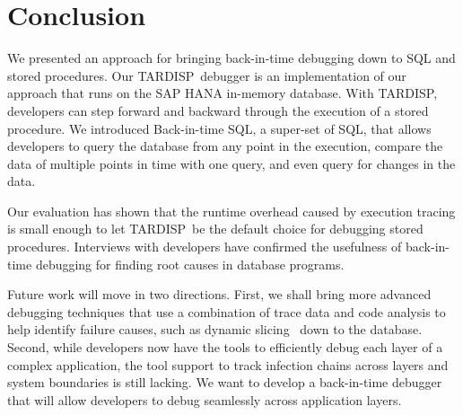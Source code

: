 \documentclass[english,conference,final]{IEEEtran}
\newcommand{\tool}{TAR\-DISP}
\newcommand{\SQLextension}{Back-in-time SQL}
\begin{document}

\section{Conclusion}
\label{sec:conclusion}

\balance
We presented an approach for bringing back-in-time debugging down to SQL and stored procedures.
Our \tool\ debugger is an implementation of our approach that runs on the SAP HANA in-memory database.
With \tool, developers can step forward and backward through the execution of a stored procedure.
We introduced \SQLextension, a super-set of SQL, that allows developers to query the database from any point in the execution, compare the data of multiple points in time with one query, and even query for changes in the data.

Our evaluation has shown that the runtime overhead caused by execution tracing is small enough to let \tool\ be the default choice for debugging stored procedures.
Interviews with developers have confirmed the usefulness of back-in-time debugging for finding root causes in database programs.

Future work will move in two directions.
First, we shall bring more advanced debugging techniques that use a combination of trace data and code analysis to help identify failure causes, such as dynamic slicing~\cite{agrawal_dynamic_1990} down to the database.
Second, while developers now have the tools to efficiently debug each layer of a complex application, the tool support to track infection chains across layers and system boundaries is still lacking.
We want to develop a back-in-time debugger that will allow developers to debug seamlessly across application layers.


%

\end{document}
